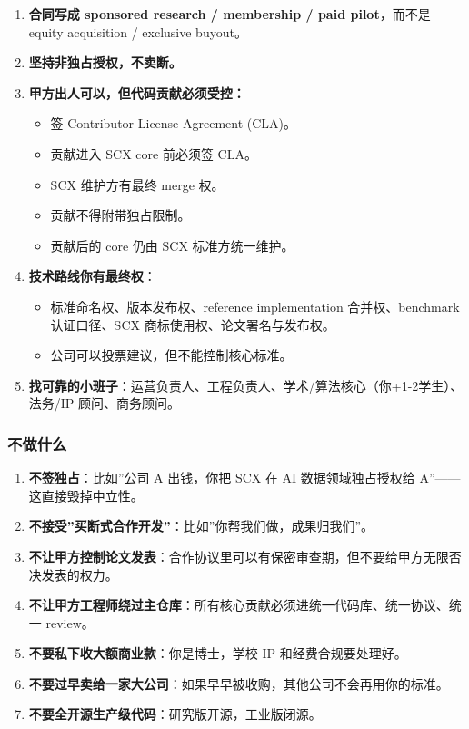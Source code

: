 \documentclass[
  12pt,
]{ctexart}
\providecommand{\tightlist}{%
  \setlength{\itemsep}{0pt}\setlength{\parskip}{0pt}}
\begin{document}
\begin{enumerate}
\def\labelenumi{\arabic{enumi}.}
\tightlist
\item
  \textbf{合同写成 sponsored research / membership / paid pilot}，而不是
  equity acquisition / exclusive buyout。
\item
  \textbf{坚持非独占授权，不卖断。}
\item
  \textbf{甲方出人可以，但代码贡献必须受控：}

  \begin{itemize}
  \tightlist
  \item
    签 Contributor License Agreement (CLA)。
  \item
    贡献进入 SCX core 前必须签 CLA。
  \item
    SCX 维护方有最终 merge 权。
  \item
    贡献不得附带独占限制。
  \item
    贡献后的 core 仍由 SCX 标准方统一维护。
  \end{itemize}
\item
  \textbf{技术路线你有最终权}：

  \begin{itemize}
  \tightlist
  \item
    标准命名权、版本发布权、reference implementation 合并权、benchmark
    认证口径、SCX 商标使用权、论文署名与发布权。
  \item
    公司可以投票建议，但不能控制核心标准。
  \end{itemize}
\item
  \textbf{找可靠的小班子}：运营负责人、工程负责人、学术/算法核心（你+1-2学生）、法务/IP
  顾问、商务顾问。
\end{enumerate}

\subsubsection{不做什么}\label{ux4e0dux505aux4ec0ux4e48-2}

\begin{enumerate}
\def\labelenumi{\arabic{enumi}.}
\tightlist
\item
  \textbf{不签独占}：比如''公司 A 出钱，你把 SCX 在 AI
  数据领域独占授权给 A''------这直接毁掉中立性。
\item
  \textbf{不接受''买断式合作开发''}：比如''你帮我们做，成果归我们''。
\item
  \textbf{不让甲方控制论文发表}：合作协议里可以有保密审查期，但不要给甲方无限否决发表的权力。
\item
  \textbf{不让甲方工程师绕过主仓库}：所有核心贡献必须进统一代码库、统一协议、统一
  review。
\item
  \textbf{不要私下收大额商业款}：你是博士，学校 IP 和经费合规要处理好。
\item
  \textbf{不要过早卖给一家大公司}：如果早早被收购，其他公司不会再用你的标准。
\item
  \textbf{不要全开源生产级代码}：研究版开源，工业版闭源。
\end{enumerate}
\end{document}
